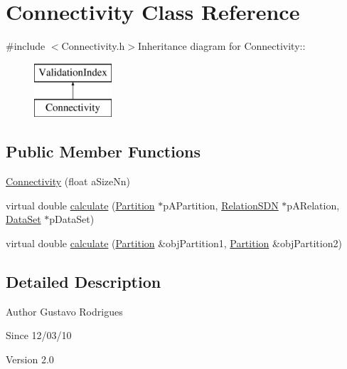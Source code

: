 \hypertarget{classConnectivity}{
\section{Connectivity Class Reference}
\label{classConnectivity}
}


{\ttfamily \#include $<$Connectivity.h$>$}Inheritance diagram for Connectivity::\begin{figure}[H]
\begin{center}
\leavevmode
\includegraphics[height=2cm]{classConnectivity}
\end{center}
\end{figure}
\subsection*{Public Member Functions}
\begin{DoxyCompactItemize}
\item 
\hyperlink{classConnectivity_a0e8314d244056ef148ae0002cdd877a7}{Connectivity} (float aSizeNn)
\item 
virtual double \hyperlink{classConnectivity_ae132296aae336b3e3830431592611a74}{calculate} (\hyperlink{classPartition}{Partition} $\ast$pAPartition, \hyperlink{classRelationSDN}{RelationSDN} $\ast$pARelation, \hyperlink{classDataSet}{DataSet} $\ast$pDataSet)
\item 
virtual double \hyperlink{classConnectivity_a5f211e2c2ff7d5f199a985c6f6e68556}{calculate} (\hyperlink{classPartition}{Partition} \&objPartition1, \hyperlink{classPartition}{Partition} \&objPartition2)
\end{DoxyCompactItemize}


\subsection{Detailed Description}
\begin{DoxyAuthor}{Author}
Gustavo Rodrigues 
\end{DoxyAuthor}
\begin{DoxySince}{Since}
12/03/10 
\end{DoxySince}
\begin{DoxyVersion}{Version}
2.0 
\end{DoxyVersion}


